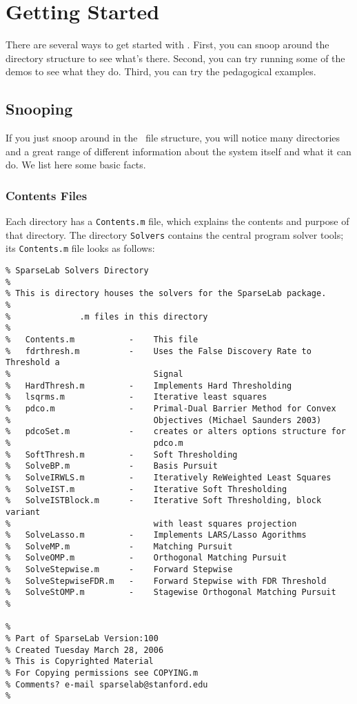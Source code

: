 \documentclass{article}
\begin{document}
\section{Getting Started}

There are several ways to get started with \WaveLab. First, you can
snoop around the directory structure to see what's there.  Second,
you can try running some of the demos to see what they do.  Third,
you can try the pedagogical examples.

\subsection{Snooping}

If you just snoop around in the \WaveLab\ file structure, you will notice many
directories and a great range of different information about the system itself
and what it can do.  We list here some basic facts.

\subsubsection{Contents Files}

Each directory has a {\tt Contents.m} file, which explains the
contents and purpose of that directory. The directory {\tt Solvers}
contains the central program solver tools; its {\tt Contents.m} file
looks as follows:
\begin{verbatim}
% SparseLab Solvers Directory
%
% This is directory houses the solvers for the SparseLab package.
%
%              .m files in this directory
%
%   Contents.m           -    This file
%   fdrthresh.m          -    Uses the False Discovery Rate to Threshold a
%                             Signal
%   HardThresh.m         -    Implements Hard Thresholding
%   lsqrms.m             -    Iterative least squares
%   pdco.m               -    Primal-Dual Barrier Method for Convex
%                             Objectives (Michael Saunders 2003)
%   pdcoSet.m            -    creates or alters options structure for
%                             pdco.m
%   SoftThresh.m         -    Soft Thresholding
%   SolveBP.m            -    Basis Pursuit
%   SolveIRWLS.m         -    Iteratively ReWeighted Least Squares
%   SolveIST.m           -    Iterative Soft Thresholding
%   SolveISTBlock.m      -    Iterative Soft Thresholding, block variant
%                             with least squares projection
%   SolveLasso.m         -    Implements LARS/Lasso Agorithms
%   SolveMP.m            -    Matching Pursuit
%   SolveOMP.m           -    Orthogonal Matching Pursuit
%   SolveStepwise.m      -    Forward Stepwise
%   SolveStepwiseFDR.m   -    Forward Stepwise with FDR Threshold
%   SolveStOMP.m         -    Stagewise Orthogonal Matching Pursuit
%

%
% Part of SparseLab Version:100
% Created Tuesday March 28, 2006
% This is Copyrighted Material
% For Copying permissions see COPYING.m
% Comments? e-mail sparselab@stanford.edu
%
\end{verbatim}
\end{document}
